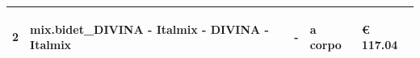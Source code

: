 \documentclass[a4paper]{article}
\begin{document}
\begin{tabular}{ | L{10mm} |  L{86mm} | L{12mm} | L{12mm} | L{16mm} | }
                            
                              \vspace{2.5mm}
                              \begin{spacing}{0}
                           2
                              \end{spacing} &
                              \vspace{2.5mm}
                              \begin{spacing}{0}
                           mix.bidet_DIVINA - Italmix - DIVINA - Italmix
                              \end{spacing} &
                              \vspace{2.5mm}
                              \begin{spacing}{0}
                           -
                              \end{spacing} &
                              \vspace{2.5mm}
                              \begin{spacing}{0}
                           a corpo
                              \end{spacing} &
                              \vspace{2.5mm}
                              \begin{spacing}{0}
                                \euro\hfill 
                            117.04
                              \end{spacing} \\
                              \hline


\end{tabular}
\end{document}
